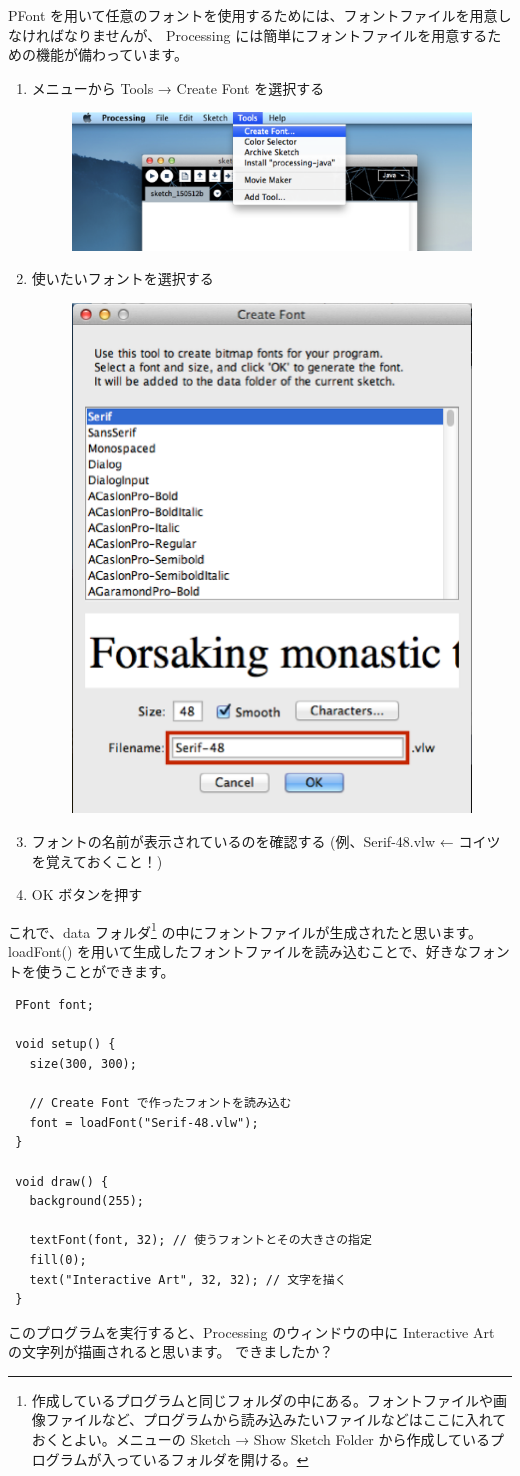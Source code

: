 \documentclass[11pt,a4paper]{jarticle}
\begin{document}
PFont を用いて任意のフォントを使用するためには、フォントファイルを用意しなければなりませんが、
Processing には簡単にフォントファイルを用意するための機能が備わっています。
\begin{enumerate}
 \item メニューから Tools → Create Font を選択する
 \begin{figure}[h]
 \centering
 \includegraphics[width=0.65\columnwidth]{img/font1.eps}
\end{figure}
 \item 使いたいフォントを選択する
 \begin{figure}[h]
 \centering
 \includegraphics[width=0.4\columnwidth]{img/font2-3.eps}
\end{figure}
 \item フォントの名前が表示されているのを確認する (例、Serif-48.vlw ← コイツを覚えておくこと！)
 \item OK ボタンを押す
\end{enumerate}


これで、data フォルダ\footnote{作成しているプログラムと同じフォルダの中にある。フォントファイルや画像ファイルなど、プログラムから読み込みたいファイルなどはここに入れておくとよい。メニューの Sketch → Show Sketch Folder から作成しているプログラムが入っているフォルダを開ける。}
の中にフォントファイルが生成されたと思います。
loadFont() を用いて生成したフォントファイルを読み込むことで、好きなフォントを使うことができます。


\begin{lstlisting}
 PFont font;

 void setup() {
   size(300, 300);

   // Create Font で作ったフォントを読み込む
   font = loadFont("Serif-48.vlw");
 }

 void draw() {
   background(255);

   textFont(font, 32); // 使うフォントとその大きさの指定
   fill(0);
   text("Interactive Art", 32, 32); // 文字を描く
 }
\end{lstlisting}
このプログラムを実行すると、Processing のウィンドウの中に Interactive Art の文字列が描画されると思います。
できましたか？
\end{document}
